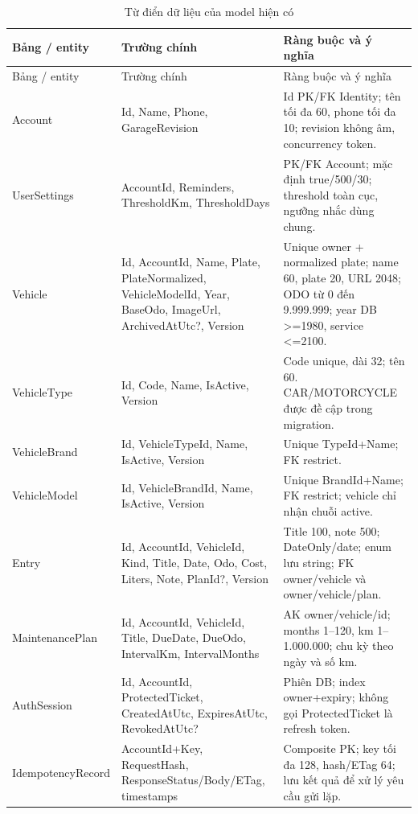 \begin{smalltable}\begin{longtable}{L{2.8cm}L{5cm}L{6.8cm}}
\caption{Từ điển dữ liệu của model hiện có}\label{tab:data-current}\\\toprule Bảng / entity & Trường chính & Ràng buộc và ý nghĩa\\\midrule\endfirsthead
\toprule Bảng / entity & Trường chính & Ràng buộc và ý nghĩa\\\midrule\endhead
Account & Id, Name, Phone, GarageRevision & Id PK/FK Identity; tên tối đa 60, phone tối đa 10; revision không âm, concurrency token.\\
UserSettings & AccountId, Reminders, ThresholdKm, ThresholdDays & PK/FK Account; mặc định true/500/30; threshold toàn cục, ngưỡng nhắc dùng chung.\\
Vehicle & Id, AccountId, Name, Plate, PlateNormalized, VehicleModelId, Year, BaseOdo, ImageUrl, ArchivedAtUtc?, Version & Unique owner + normalized plate; name 60, plate 20, URL 2048; ODO từ 0 đến 9.999.999; year DB >=1980, service <=2100.\\
VehicleType & Id, Code, Name, IsActive, Version & Code unique, dài 32; tên 60. CAR/MOTORCYCLE được đề cập trong migration.\\
VehicleBrand & Id, VehicleTypeId, Name, IsActive, Version & Unique TypeId+Name; FK restrict.\\
VehicleModel & Id, VehicleBrandId, Name, IsActive, Version & Unique BrandId+Name; FK restrict; vehicle chỉ nhận chuỗi active.\\
Entry & Id, AccountId, VehicleId, Kind, Title, Date, Odo, Cost, Liters, Note, PlanId?, Version & Title 100, note 500; DateOnly/date; enum lưu string; FK owner/vehicle và owner/vehicle/plan.\\
MaintenancePlan & Id, AccountId, VehicleId, Title, DueDate, DueOdo, IntervalKm, IntervalMonths & AK owner/vehicle/id; months 1--120, km 1--1.000.000; chu kỳ theo ngày và số km.\\
AuthSession & Id, AccountId, ProtectedTicket, CreatedAtUtc, ExpiresAtUtc, RevokedAtUtc? & Phiên DB; index owner+expiry; không gọi ProtectedTicket là refresh token.\\
Idempotency\allowbreak Record & AccountId+Key, RequestHash, ResponseStatus/Body/ETag, timestamps & Composite PK; key tối đa 128, hash/ETag 64; lưu kết quả để xử lý yêu cầu gửi lặp.\\\bottomrule
\end{longtable}\end{smalltable}

